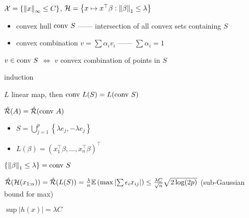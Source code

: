\begin{example}[$l_1$-constraint]
    \begin{setting}
        $\mathcal{X} = \left\{ \left\lVert x\right\rVert_\infty \leq C \right\}$, $\mathcal{H} = \left\{ x \mapsto x^\top \beta : \left\lVert\beta\right\rVert_1 \leq \lambda \right\}$
    \end{setting}
    \begin{itemize}
        \item convex hull $\textnormal{conv } S$ ------ intersection of all convex sets containing $S$
        \item convex combination $v = \sum \alpha_i v_i$ ------ $\sum \alpha_i = 1$
    \end{itemize}
    \begin{lemma}
        $v \in \textnormal{conv } S$ $\iff$ $v$ convex combination of points in $S$
    \end{lemma}
    \begin{pf}
         induction
    \end{pf}
    \begin{lemma}
        $L$ linear map, then $\textnormal{conv } L(S) = L(\textnormal{conv } S)$
    \end{lemma}
    \begin{lemma}
        $\hat {\mathcal{R}}(A) = \hat {\mathcal{R}} (\textnormal{conv } A)$
    \end{lemma}
    \begin{itemize}
        \item $S = \bigcup_{j=1}^p \left\{ \lambda e_j, - \lambda e_j \right\}$
        \item $L(\beta) = (x_1^\top \beta, \dots, x_n^\top \beta)^\top$
    \end{itemize}
    \begin{fact}
        $\left\{ \left\lVert\beta\right\rVert_1 \leq \lambda \right\} = \textnormal{conv } S$
    \end{fact}
    \begin{fact}
        $\hat {\mathcal{R}}(\mathcal{H}(x_{1:n})) = \hat {\mathcal{R}} (L(S))= \frac{\lambda}{n} \mathbb{E}\left(\max \left| \sum \epsilon_i x_{ij} \right|\right) \leq \frac{\lambda C}{\sqrt{n}} \sqrt{2 \log(2p)}$ (sub-Gaussian bound for max)
    \end{fact}
    \begin{fact}
        $\sup |h(x)| = \lambda C$
    \end{fact}
\end{example}

